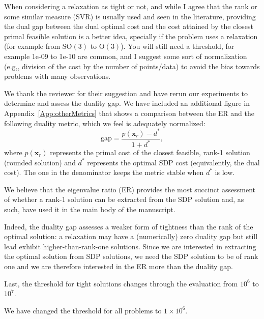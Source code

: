 When considering a relaxation as tight or not, and while I agree that the rank or some similar measure (SVR) is usually used and seen in the literature, providing the dual gap between the dual optimal cost and the cost attained by the closest primal feasible solution is a better idea, specially if the problem uses a relaxation (for example from $\mbox{SO}(3)$ to $\mbox{O}(3)$). You will still need a threshold, for example 1e-09 to 1e-10 are common, and I suggest some sort of normalization (e.g,, division of the cost by the number of points/data) to avoid the bias towards problems with many observations. 
\begin{response}
    We thank the reviewer for their suggestion and have rerun our experiments to determine and assess the duality gap. We have included an additional figure in Appendix~\ref{App:otherMetrics} that shows a comparison between the ER and the following duality metric, which we feel is adequately normalized:
    \begin{equation*}
        \mbox{gap} = \frac{p(\bm{x}_r)-d^*}{1+d^*},
    \end{equation*}
    where $p(\bm{x}_r)$ represents the primal cost of the closest feasible, rank-1 solution (rounded solution) and $d^*$ represents the optimal SDP cost (equivalently, the dual cost). The one in the denominator keeps the metric stable when $d^*$ is low. 
    
    We believe that the eigenvalue ratio (ER) provides the most succinct assessment of whether a rank-1 solution can be extracted from the SDP solution and, as such, have used it in the main body of the manuscript. 

    Indeed, the duality gap assesses a weaker form of tightness than the rank of the optimal solution: a relaxation may have a (numerically) zero duality gap but still lead exhibit higher-than-rank-one solutions. Since we are interested in extracting the optimal solution from SDP solutions, we need the SDP solution to be of rank one and we are therefore interested in the ER more than the duality gap.

\end{response}

Last, the threshold for tight solutions changes through the evaluation from $10^6$ to $10^7$. 

\begin{response}
    We have changed the threshold for all problems to $1\times10^6$.
\end{response}

